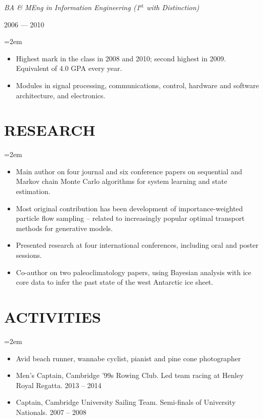 \documentclass[letterpaper,10pt]{article}
\newcommand{\NewPart}[1]{\vspace{-1em} \section*{\uppercase{#1}}}
\newcommand{\SubHeading}[1]{\noindent\textit{#1}}
\newcommand{\DateBox}[1]{\colorbox{light-gray}{\parbox{8em}{\hfill\color{White}#1}}}
\newcommand{\Details}[1]{\hangindent=2em\hangafter=0\small#1\normalsize\par}
\newcommand{\EducationEntry}[3]{%
                \SubHeading{#1} \hfill \DateBox{#2} \par
                \Details{#3} }
\begin{document}
\EducationEntry{BA \& MEng in Information Engineering (1$^{\text{st}}$ with Distinction)}{2006 --- 2010}{
\begin{itemize}
  \item Highest mark in the class in 2008 and 2010; second highest in 2009. Equivalent of 4.0 GPA every year.
  \item Modules in signal processing, communications, control, hardware and software architecture, and electronics.
\end{itemize}
}



\NewPart{Research}
\Details{
\begin{itemize}
 \item Main author on four journal and six conference papers on sequential and Markov chain Monte Carlo algorithms for system learning and state estimation.
 \item Most original contribution has been development of importance-weighted particle flow sampling -- related to increasingly popular optimal transport methods for generative models.
 \item Presented research at four international conferences, including oral and poster sessions.
 \item Co-author on two paleoclimatology papers, using Bayesian analysis with ice core data to infer the past state of the west Antarctic ice sheet.
\end{itemize}
}



\NewPart{Activities}

\Details{
\begin{itemize}
 \item Avid beach runner, wannabe cyclist, pianist and  pine cone photographer
 \item Men's Captain, Cambridge '99s Rowing Club. Led team racing at Henley Royal Regatta. 2013 -- 2014
 \item Captain, Cambridge University Sailing Team. Semi-finals of University Nationals. 2007 -- 2008
\end{itemize}
}
\end{document}
